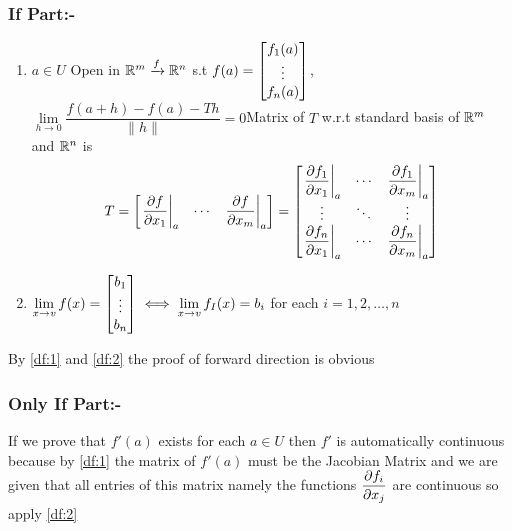 \begin{myproof}
	\subsubsection{If Part:-}
	\begin{enumerate}[label=\bfseries\tiny\protect\circled{\small\arabic*}]
		\item \label{df:1} $a\in U$ Open in $\mathbb{R}^m\xrightarrow{f}\mathbb{R}^n$ s.t $f(a)=\left[ \begin{matrix}
		f_1(a)\\ \vdots\\ f_n(a)
	\end{matrix} \right]$, $\lim\limits_{h\to 0}\dfrac{f(a+h)-f(a)-Th}{\|h\|}=0$Matrix of $T$ w.r.t standard basis of $\mathbb{R}^m$ and $\mathbb{R}^n$ is \[T=  \left[ \begin{matrix}
	\left.\dfrac{\partial f}{\partial x_1}\right|_a & \cdots & \left.\dfrac{\partial f}{\partial x_m}\right|_a
\end{matrix} \right]=\left[ \begin{matrix}
\left.\dfrac{\partial f_1}{\partial x_1}\right|_a & \cdots & \left.\dfrac{\partial f_1}{\partial x_m}\right|_a\\
\vdots & \ddots & \vdots\\
\left.\dfrac{\partial f_n}{\partial x_1}\right|_a & \cdots & \left.\dfrac{\partial f_n}{\partial x_m}\right|_a
\end{matrix} \right]\]
\item \label{df:2}$\lim\limits_{x\to v}f(x)=\left[ \begin{matrix}
	b_1\\ \vdots\\ b_n
\end{matrix} \right]\iff \lim\limits_{x\to v}f_I(x)=b_i$ for each $i=1,2,\dots,n$
	\end{enumerate}
By \ref{df:1} and \ref{df:2}  the proof of forward direction is obvious
\subsubsection{Only If Part:-}
If we prove that $f'(a)$ exists for each $a\in U$ then $f'$ is automatically continuous because by \ref{df:1} the matrix of $f'(a)$ must be the Jacobian Matrix and we are given that all entries of this matrix namely the functions $\dfrac{\partial f_i}{\partial x_j}$ are continuous so apply \ref{df:2}


\end{myproof}
